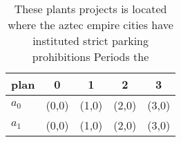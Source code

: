 \documentclass[a4paper]{article}
\begin{document}
\begin{table}
\begin{adjustbox}{width=0.9\columnwidth}
\begin{tabular}{|l|l|l|l|l|}
\hline
\textbf{plan} & \multicolumn{1}{c|}{\textbf{0}} & \multicolumn{1}{c|}{\textbf{1}} & \multicolumn{1}{c|}{\textbf{2}} & \multicolumn{1}{c|}{\textbf{3}} \\ \hline
\textbf{$a_0$}  & (0,0) & (1,0) & (2,0) & (3,0) \\ \hline
\textbf{$a_1$}  & (0,0) & (1,0) & (2,0) & (3,0) \\ \hline
\end{tabular}
\end{adjustbox}
\caption{These plants projects is located where the aztec empire cities have instituted strict parking prohibitions Periods the 
}
\end{table}
\end{document}
